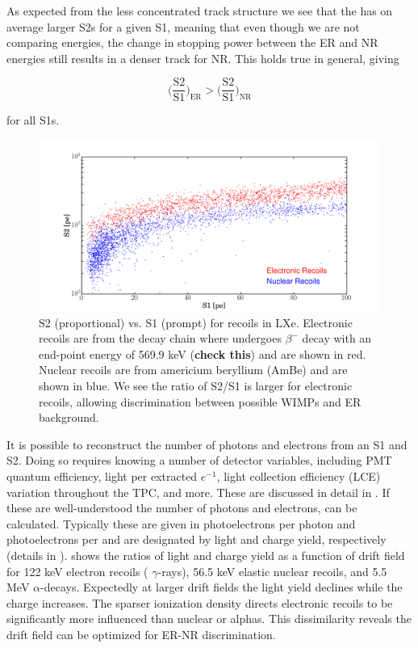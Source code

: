 As expected from the less concentrated track structure we see that the 
has on average larger S2s for a given S1, meaning that even though we are not comparing energies, the change in stopping
power between the ER and NR energies still results in a denser track for NR.  This holds true in general, giving

\begin{equation}
\Big( \frac{\mathrm{S}2}{\mathrm{S}1} \Big)_{\mathrm{ER}} > \Big( \frac{\mathrm{S}2}{\mathrm{S}1} \Big)_{\mathrm{NR}}
\end{equation}

for all S1s.

\begin{figure}
\centering
\includegraphics[width=\textwidth]{ERNRComparison}
\caption{S2 (proportional) vs. S1 (prompt) for recoils in LXe.  Electronic recoils are from the  decay chain where
 undergoes $\beta^{-}$ decay with an end-point energy of 569.9 keV (\textbf{check this}) and are shown in red.  Nuclear
recoils are from americium beryllium (AmBe) and are shown in blue.  We see the ratio of S2/S1 is larger for electronic recoils,
allowing discrimination between possible WIMPs and ER background.}
\label{fig:tpcs_signals_ernr}
\end{figure}

It is possible to reconstruct the number of photons and electrons from an S1 and S2.  Doing so requires knowing a number of detector
variables, including PMT quantum efficiency, light per extracted $e^{-1}$, light collection efficiency (LCE) variation throughout
the TPC, and more.  These are discussed in detail in \secref{}.  If these are well-understood the number of photons and electrons,
can be calculated.  Typically these are given in photoelectrons per photon and photoelectrons per \electron and are designated by
light and charge yield, respectively (details in \secref{}).   shows the ratios of light and
charge yield as a function of drift field for 122 keV electron recoils ( $\gamma$-rays), 56.5 keV elastic nuclear recoils, and
5.5 MeV $\alpha$-decays.  Expectedly at larger drift fields the light yield declines while the charge increases.  The sparser
ionization density directs electronic recoils to be significantly more influenced than nuclear or alphas.  This dissimilarity reveals
the drift field can be optimized for ER-NR discrimination.

